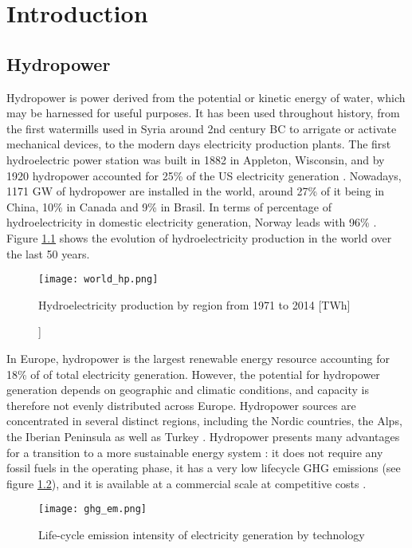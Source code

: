\chapter{Introduction}
\label{chap:introduction}


\section{Hydropower}

Hydropower is power derived from the potential or kinetic energy of water, which may be harnessed for useful purposes. It has been used throughout history, from the first watermills used in Syria around 2nd century BC \cite{reynolds} to arrigate or activate mechanical devices, to the modern days electricity production plants. The first hydroelectric power station was built in 1882 in Appleton, Wisconsin, and by 1920 hydropower accounted for 25\% of the US electricity generation \cite{hist_hyd}. \newline
Nowadays, 1171 GW of hydropower are installed in the world, around 27\% of it being in China, 10\% in Canada and 9\% in Brasil. In terms of percentage of hydroelectricity in domestic electricity generation, Norway leads with 96\% \cite{iea_stat}. Figure \ref{world_hp} shows the evolution of hydroelectricity production in the world over the last 50 years.

\begin{figure}[H]
\centering
\texttt{[image: world\_hp.png]}
\caption[Hydroelectricity production by region from 1971 to 2014 [TWh]]{Hydroelectricity production by region from 1971 to 2014 [TWh] \cite{iea_stat}}
\centering
\label{world_hp}
\end{figure}

In Europe, hydropower is the largest renewable energy resource accounting for 18\% of of total electricity generation. However, the potential for hydropower generation depends on geographic and climatic conditions, and capacity is therefore not evenly distributed across Europe. Hydropower sources are concentrated in several distinct regions, including the Nordic countries, the Alps, the Iberian Peninsula as well as Turkey \cite{hp_europe}. Hydropower presents many advantages for a transition to a more sustainable energy system : it does not require any fossil fuels in the operating phase, it has a very low lifecycle GHG emissions (see figure \ref{ghg_em}), and it is available at a commercial scale at competitive costs \cite{hp_europe}. 

\begin{figure}[H]
\centering
\texttt{[image: ghg\_em.png]}
\caption[Life-cycle emission intensity of electricity generation by technology]{Life-cycle emission intensity of electricity generation by technology \cite{hp_europe}}
\label{ghg_em}
\end{figure}

